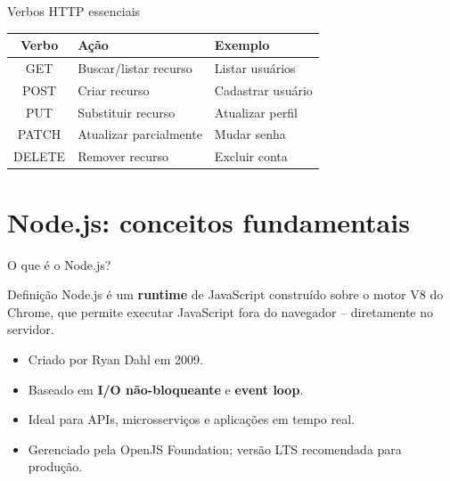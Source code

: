 \documentclass[aspectratio=169]{beamer}
\begin{document}
\begin{frame}{Verbos HTTP essenciais}
\begin{center}
\begin{tabular}{|c|l|l|}
\hline
\textbf{Verbo} & \textbf{A\c{c}\~ao} & \textbf{Exemplo} \\
\hline
GET    & Buscar/listar recurso   & Listar usu\'arios    \\
POST   & Criar recurso           & Cadastrar usu\'ario  \\
PUT    & Substituir recurso      & Atualizar perfil    \\
PATCH  & Atualizar parcialmente  & Mudar senha         \\
DELETE & Remover recurso         & Excluir conta       \\
\hline
\end{tabular}
\end{center}
\end{frame}

\section{Node.js: conceitos fundamentais}

\begin{frame}{O que \'{e} o Node.js?}
\begin{block}{Defini\c{c}\~ao}
Node.js \'{e} um \textbf{runtime} de JavaScript constru\'ido sobre o motor V8 do Chrome, que permite executar JavaScript fora do navegador -- diretamente no servidor.
\end{block}
\begin{itemize}
  \item Criado por Ryan Dahl em 2009.
  \item Baseado em \textbf{I/O n\~ao-bloqueante} e \textbf{event loop}.
  \item Ideal para APIs, microsservi\c{c}os e aplica\c{c}\~oes em tempo real.
  \item Gerenciado pela OpenJS Foundation; vers\~ao LTS recomendada para produ\c{c}\~ao.
\end{itemize}
\end{frame}
\end{document}
